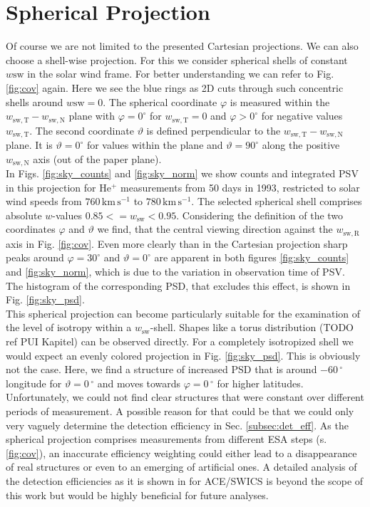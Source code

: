 \section{Spherical Projection}
Of course we are not limited to the presented Cartesian projections.
We can also choose a shell-wise projection. For this we consider spherical shells of constant $w\mathrm{sw}$ in the solar wind frame. For better understanding we can refer to Fig. \ref{fig:cov} again. Here we see the blue rings as 2D cuts through such concentric shells around $w\mathrm{sw} = 0$. The spherical coordinate $\varphi$ is measured within the $w_\mathrm{sw,T}-w_\mathrm{sw,N}$ plane with $\varphi = 0^\circ$ for $w_\mathrm{sw,T} = 0$ and $\varphi > 0^\circ$ for negative values $w_\mathrm{sw,T}$. The second coordinate $\vartheta$ is defined perpendicular to the $w_\mathrm{sw,T}-w_\mathrm{sw,N}$ plane. It is $\vartheta = 0 ^\circ$ for values within the plane and $\vartheta = 90^\circ$ along the positive $w_\mathrm{sw,N}$ axis (out of the paper plane).
\\
In Figs. \ref{fig:sky_counts} and \ref{fig:sky_norm} we show counts and integrated PSV in this projection for $\mathrm{He^{+}}$ measurements from 50 days in 1993, restricted to solar wind speeds from $760 \, \mathrm{km\,s^{-1}}$ to $780 \, \mathrm{km\,s^{-1}}$. The selected spherical shell comprises absolute $w$-values $0.85 <= w_\mathrm{sw} < 0.95$. Considering the definition of the two coordinates $\varphi$ and $\vartheta$ we find, that the central viewing direction against the $w_\mathrm{sw,R}$ axis in Fig. \ref{fig:cov}. Even more clearly than in the Cartesian projection sharp peaks around $\varphi = 30 ^\circ$ and $\vartheta = 0 ^\circ$ are apparent in both figures \ref{fig:sky_counts} and \ref{fig:sky_norm}, which is due to the variation in observation time of PSV. The histogram of the corresponding PSD, that excludes this effect, is shown in Fig. \ref{fig:sky_psd}.\\
This spherical projection can become particularly suitable for the examination of the level of isotropy within a $w_\mathrm{sw}$-shell. Shapes like a torus distribution (TODO ref PUI Kapitel) can be observed directly. For a completely isotropized shell we would expect an evenly colored projection in Fig. \ref{fig:sky_psd}. This is obviously not the case. Here, we find a structure of increased PSD that is around $-60\,^\circ$ longitude for $\vartheta = 0\,^\circ$ and moves towards $\varphi = 0\,^\circ$ for higher latitudes.
\\
Unfortunately, we could not find clear structures that were constant over different periods of measurement. A possible reason for that could be that we could only very vaguely determine the detection efficiency in Sec. \ref{subsec:det_eff}. As the spherical projection comprises measurements from different ESA steps (s. \ref{fig:cov}), an inaccurate efficiency weighting could either lead to a disappearance of real structures or even to an emerging of artificial ones. A detailed analysis of the detection efficiencies as it is shown in \citet{koeten} for ACE/SWICS is beyond the scope of this work but would be highly beneficial for future analyses.
